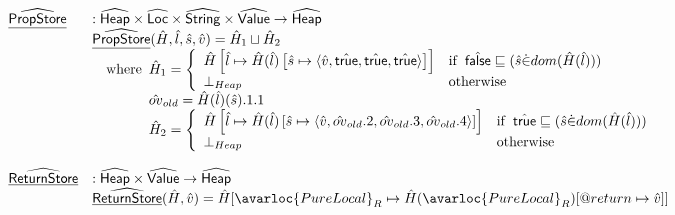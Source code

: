 \[
\begin{array}{ll}

\ahf{PropStore} & : \aHeap \times \aLoc \times \abs{String} \times \aValue \rightarrow \aHeap \\
& \ahf{PropStore}(\hat{H},\hat{l},\hat{s},\hat{v})
  = \hat{H}_1\sqcup\hat{H}_2\\
& \quad\wherec{
\hat{H}_1 = \left\{
    \begin{array}{ll}
      \hat{H}\left[\hat{l}\mapsto \hat{H}(\hat{l})\left[\hat{s}\mapsto \langle\hat{v},\atrue,\atrue,\atrue\rangle\right]\right] & \ifc{\afalse\sqsubseteq(\hat{s} \dot{\in} dom(\hat{H}(\hat{l})))} \\
      \bot_{Heap} & \owc \\
    \end{array}
  \right. \\
  \hat{ov}_{old}=\hat{H}(\hat{l})(\hat{s}).1.1\\
  \hat{H}_2 = \left\{
    \begin{array}{ll}
      \hat{H}\left[\hat{l}\mapsto \hat{H}(\hat{l})\left[\hat{s}\mapsto
          \langle \hat{v},\hat{ov}_{old}.2,\hat{ov}_{old}.3,\hat{ov}_{old}.4\rangle
        \right]\right] & \ifc{\atrue\sqsubseteq (\hat{s} \dot{\in} dom(\hat{H}(\hat{l})))}\\
      \bot_{Heap} & \owc \\
    \end{array}
  \right. \\
}\\
\\

\ahf{ReturnStore} & : \aHeap \times \aValue \rightarrow \aHeap\\
& \ahf{ReturnStore}(\hat{H}, \hat{v}) = \hat{H}[\avarloc{PureLocal}_R \mapsto \hat{H}(\avarloc{PureLocal}_R)[\varprop{return} \mapsto \hat{v}]]\\
\\


\end{array}\]
